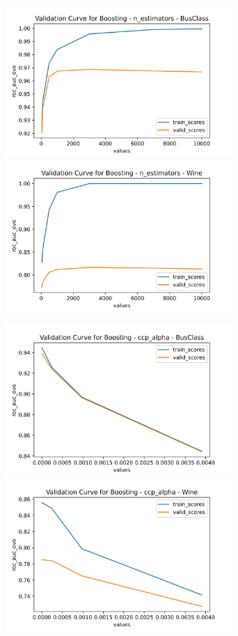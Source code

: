 \documentclass[
	letterpaper, %
]{jdf}
\begin{document}
\includegraphics[width=3.4in]{Figures/BusClass-0920/GBM/val_curve_0.png}
\includegraphics[width=3.4in]{Figures/Wine-0921/GBM/val_curve_0.png}

\includegraphics[width=3.4in]{Figures/BusClass-0920/GBM/val_curve_1.png}
\includegraphics[width=3.4in]{Figures/Wine-0921/GBM/val_curve_1.png}
\end{document}

